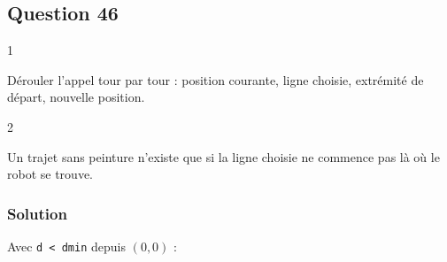 \documentclass[11pt,a4paper]{article}
\begin{document}
\hypertarget{question-46}{%
\subsection{Question 46}\label{question-46}}

\begin{indication}{1}

Dérouler l'appel tour par tour : position courante, ligne choisie, extrémité de départ, nouvelle position.

\end{indication}

\begin{indication}{2}

Un trajet sans peinture n'existe que si la ligne choisie ne commence pas là où le robot se trouve.

\end{indication}

\hypertarget{solution-45}{%
\subsubsection{Solution}\label{solution-45}}

Avec \texttt{d\ \textless{}\ dmin} depuis \((0,0)\) :
\end{document}
